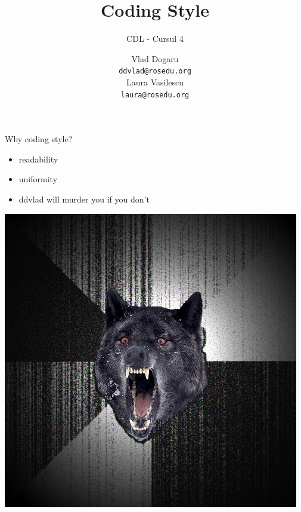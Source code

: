 \documentclass{beamer}
\title[]{Coding Style}
\subtitle{CDL - Cursul 4}
\institute[CDL 2011]{ROSEdu}
\author[]{Vlad Dogaru \\ \texttt{ddvlad@rosedu.org} \\ Laura Vasilescu \\
\texttt{laura@rosedu.org}}
\begin{document}
\maketitle

\begin{frame}{Why coding style?}
  \pause
  \begin{itemize}
    \item readability
    \pause
    \item uniformity
    \pause
    \item ddvlad will murder you if you don't
    \pause
  \end{itemize}
  \begin{center}
    \includegraphics[scale=0.3]{wolf}
  \end{center}
\end{frame}
\end{document}
